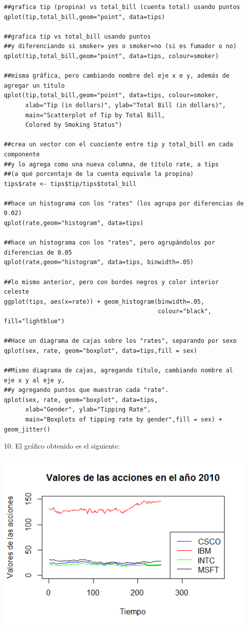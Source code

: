 \documentclass[11pt,a4paper]{article}
\begin{document}
\begin{itemize}
\begin{verbatim}
##grafica tip (propina) vs total_bill (cuenta total) usando puntos
qplot(tip,total_bill,geom="point", data=tips)

##grafica tip vs total_bill usando puntos 
##y diferenciando si smoker= yes o smoker=no (si es fumador o no)
qplot(tip,total_bill,geom="point", data=tips, colour=smoker) 

##misma gráfica, pero cambiando nombre del eje x e y, además de agregar un título
qplot(tip,total_bill,geom="point", data=tips, colour=smoker, 
      xlab="Tip (in dollars)", ylab="Total Bill (in dollars)",
      main="Scatterplot of Tip by Total Bill,
      Colored by Smoking Status")

##crea un vector con el cuociente entre tip y total_bill en cada componente   
##y lo agrega como una nueva columna, de título rate, a tips 
##(a qué porcentaje de la cuenta equivale la propina)
tips$rate <- tips$tip/tips$total_bill 

##hace un histograma con los "rates" (los agrupa por diferencias de 0.02)
qplot(rate,geom="histogram", data=tips) 

##hace un histograma con los "rates", pero agrupándolos por diferencias de 0.05
qplot(rate,geom="histogram", data=tips, binwidth=.05) 

##lo mismo anterior, pero con bordes negros y color interior celeste
ggplot(tips, aes(x=rate)) + geom_histogram(binwidth=.05,
                                           colour="black", fill="lightblue") 

##Hace un diagrama de cajas sobre los "rates", separando por sexo
qplot(sex, rate, geom="boxplot", data=tips,fill = sex) 

##Mismo diagrama de cajas, agregando título, cambiando nombre al eje x y al eje y, 
##y agregando puntos que muestran cada "rate".
qplot(sex, rate, geom="boxplot", data=tips,
      xlab="Gender", ylab="Tipping Rate",
      main="Boxplots of tipping rate by gender",fill = sex) + geom_jitter() 
\end{verbatim}
\item[10.] El gráfico obtenido es el siguiente:
\begin{center}
\includegraphics[scale=0.6]{plot}
\end{center}


\end{itemize}
\end{document}

